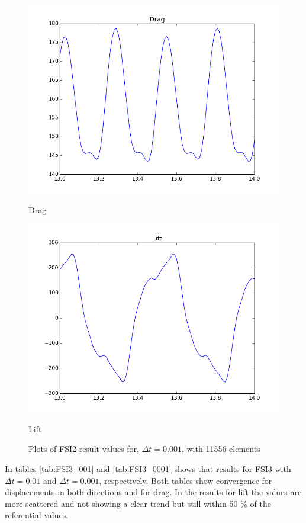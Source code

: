 \begin{figure}[H]
\begin{minipage}[b]{0.6\linewidth}
    \includegraphics[width=0.9\linewidth]{./Verification_Validation/Hron_Turek/FSI2_drag.png} 
    \caption{Drag} 
    \vspace{4ex}
  \end{minipage}%
  \begin{minipage}[b]{0.6\linewidth}
    \centering
    \includegraphics[width=0.9\linewidth]{./Verification_Validation/Hron_Turek/FSI2_lift.png} 
    \caption{Lift} 
    \vspace{4ex}
  \end{minipage} 
  \caption{Plots of FSI2 result values for, $\Delta t = 0.001$, with 11556 elements}
\end{figure}

In tables \ref{tab:FSI3_001} and \ref{tab:FSI3_0001} shows that results for FSI3 with $\Delta t = 0.01$ and $\Delta t = 0.001$, respectively. Both tables show convergence for displacements in both directions and for drag. In the results for lift the values are more scattered and not showing a clear trend but still within 50 \% of the referential values.

